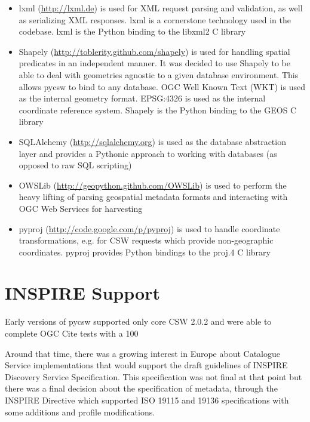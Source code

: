 \begin{itemize}
\item lxml (\url{http://lxml.de}) is used for XML request parsing and validation, as well as serializing XML responses.  lxml is a cornerstone technology used in the codebase.  lxml is the Python binding to the libxml2 C library
\item Shapely (\url{http://toblerity.github.com/shapely}) is used for handling spatial predicates in an independent manner.  It was decided to use Shapely to be able to deal with geometries agnostic to a given database environment.  This allows pycsw to bind to any database.  OGC Well Known Text (WKT) is used as the internal geometry format.  EPSG:4326 is used as the internal coordinate reference system.  Shapely is the Python binding to the GEOS C library
\item SQLAlchemy (\url{http://sqlalchemy.org}) is used as the database abstraction layer and provides a Pythonic approach to working with databases (as opposed to raw SQL scripting)
\item OWSLib (\url{http://geopython.github.com/OWSLib}) is used to perform the heavy lifting of parsing geospatial metadata formats and interacting with OGC Web Services for harvesting
\item pyproj (\url{http://code.google.com/p/pyproj}) is used to handle coordinate transformations, e.g. for CSW requests which provide non-geographic coordinates.  pyproj provides Python bindings to the proj.4 C library
\end{itemize}

\section{INSPIRE Support}
\label{sec:inspire}

Early versions of pycsw supported only core CSW 2.0.2 \citep{csw:2007} and were able to complete OGC Cite tests with a 100%

Around that time, there was a growing interest in Europe about Catalogue Service implementations that would support the draft guidelines of INSPIRE Discovery Service Specification. This specification was not final at that point but there was a final decision about the specification of metadata, through the INSPIRE Directive \citep{inspiremd:2008} which supported ISO 19115 and 19136 specifications with some additions and profile modifications.

